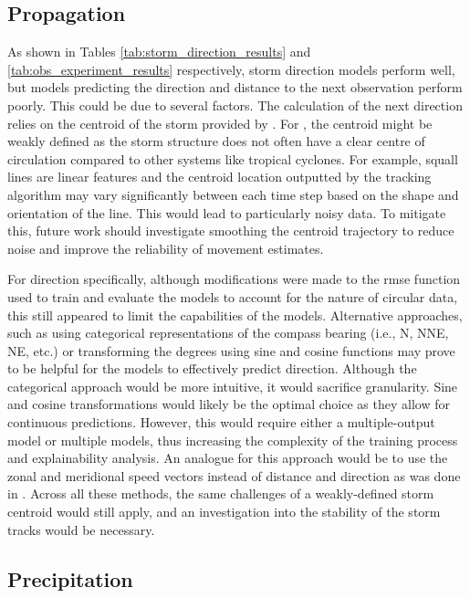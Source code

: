 \clearpage

\subsection{Propagation}
\label{sec:results-propagation}

As shown in Tables \ref{tab:storm_direction_results} and \ref{tab:obs_experiment_results} respectively, storm direction models perform well, but models predicting the direction and distance to the next observation perform poorly. This could be due to several factors. The calculation of the next direction relies on the centroid of the storm provided by \cite{Hill2023}. For , the centroid might be weakly defined as the storm structure does not often have a clear centre of circulation compared to other systems like tropical cyclones. For example, squall lines are linear features and the centroid location outputted by the tracking algorithm may vary significantly between each time step based on the shape and orientation of the line. This would lead to particularly noisy data. To mitigate this, future work should investigate smoothing the centroid trajectory to reduce noise and improve the reliability of movement estimates.

For direction specifically, although modifications were made to the \acrshort{rmse} function used to train and evaluate the models to account for the nature of circular data, this still appeared to limit the capabilities of the models. Alternative approaches, such as using categorical representations of the compass bearing (i.e., N, NNE, NE, etc.) or transforming the degrees using sine and cosine functions may prove to be helpful for the models to effectively predict direction. Although the categorical approach would be more intuitive, it would sacrifice granularity. Sine and cosine transformations would likely be the optimal choice as they allow for continuous predictions. However, this would require either a multiple-output model or multiple models, thus increasing the complexity of the training process and explainability analysis. An analogue for this approach would be to use the zonal and meridional speed vectors instead of distance and direction as was done in \cite{Hunt2024}. Across all these methods, the same challenges of a weakly-defined storm centroid would still apply, and an investigation into the stability of the storm tracks would be necessary.

\subsection{Precipitation}

